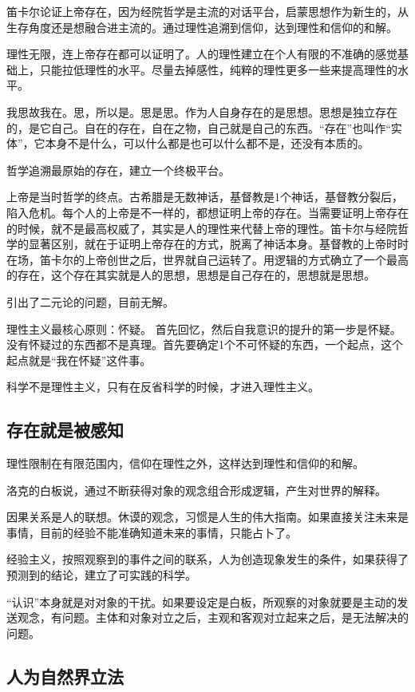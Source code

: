 \documentclass[UTF8]{../RepresentationUniverse}
\begin{document}
笛卡尔论证上帝存在，因为经院哲学是主流的对话平台，启蒙思想作为新生的，从生存角度还是想融合进主流的。通过理性追溯到信仰，达到理性和信仰的和解。

理性无限，连上帝存在都可以证明了。人的理性建立在个人有限的不准确的感觉基础上，只能拉低理性的水平。尽量去掉感性，纯粹的理性更多一些来提高理性的水平。

我思故我在。思，所以是。思是思。作为人自身存在的是思想。思想是独立存在的，是它自己。自在的存在，自在之物，自己就是自己的东西。“存在”也叫作“实体”，它本身不是什么，可以什么都是也可以什么都不是，还没有本质的。

哲学追溯最原始的存在，建立一个终极平台。

上帝是当时哲学的终点。古希腊是无数神话，基督教是1个神话，基督教分裂后，陷入危机。每个人的上帝是不一样的，都想证明上帝的存在。当需要证明上帝存在的时候，就不是最高权威了，其实是人的理性来代替上帝的理性。笛卡尔与经院哲学的显著区别，就在于证明上帝存在的方式，脱离了神话本身。基督教的上帝时时在场，笛卡尔的上帝创世之后，世界就自己运转了。用逻辑的方式确立了一个最高的存在，这个存在其实就是人的思想，思想是自己存在的，思想就是思想。

引出了二元论的问题，目前无解。

理性主义最核心原则：怀疑。
首先回忆，然后自我意识的提升的第一步是怀疑。没有怀疑过的东西都不是真理。首先要确定1个不可怀疑的东西，一个起点，这个起点就是“我在怀疑”这件事。

科学不是理性主义，只有在反省科学的时候，才进入理性主义。

\subsection{存在就是被感知}

理性限制在有限范围内，信仰在理性之外，这样达到理性和信仰的和解。

洛克的白板说，通过不断获得对象的观念组合形成逻辑，产生对世界的解释。

因果关系是人的联想。休谟的观念，习惯是人生的伟大指南。如果直接关注未来是事情，目前的经验不能准确知道未来的事情，只能占卜了。

经验主义，按照观察到的事件之间的联系，人为创造现象发生的条件，如果获得了预测到的结论，建立了可实践的科学。

“认识”本身就是对对象的干扰。如果要设定是白板，所观察的对象就要是主动的发送观念，有问题。主体和对象对立之后，主观和客观对立起来之后，是无法解决的问题。

\subsection{人为自然界立法}
\end{document}
